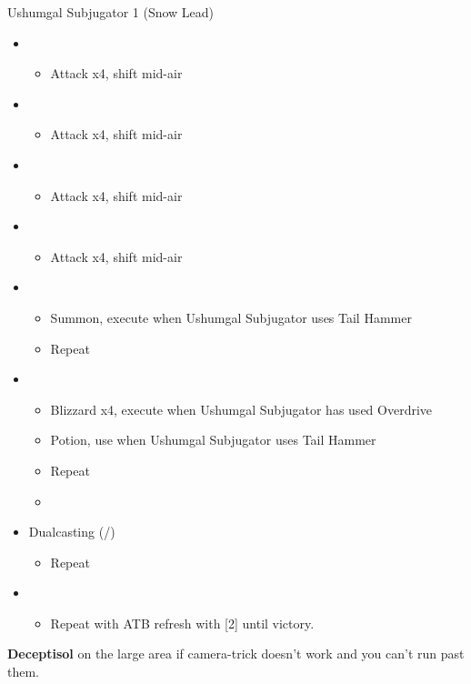 \begin{multicols}{2}
\renewcommand{\sixth}{[6] Dualcasting (\rav/\rav)}
\begin{battle}{Ushumgal Subjugator 1 (Snow Lead)}
\begin{itemize}
    \item \first
    \begin{itemize}
        \item Attack x4, shift mid-air
    \end{itemize}
    \item \second
    \begin{itemize}
        \item Attack x4, shift mid-air
    \end{itemize}
    \item \first
    \begin{itemize}
        \item Attack x4, shift mid-air
    \end{itemize}
    \item \second
    \begin{itemize}
        \item Attack x4, shift mid-air
    \end{itemize}
    \item \first
    \begin{itemize}
        \item Summon, execute when Ushumgal Subjugator uses Tail Hammer
        \item Repeat
     \end{itemize}
    \item \fifth
    \begin{itemize}
        \item Blizzard x4, execute when Ushumgal Subjugator has used Overdrive
        \item Potion, use when Ushumgal Subjugator uses Tail Hammer
        \item Repeat
        \item \stagger
    \end{itemize}
    \item \sixth
    \begin{itemize}
        \item Repeat
    \end{itemize}
    \item \first
    \begin{itemize}
        \item Repeat with ATB refresh with [2] until victory.
    \end{itemize}
\end{itemize}
\end{battle}
\textbf{Deceptisol} on the large area if camera-trick doesn't work and you can't run past them.

\vfill
\end{multicols}
